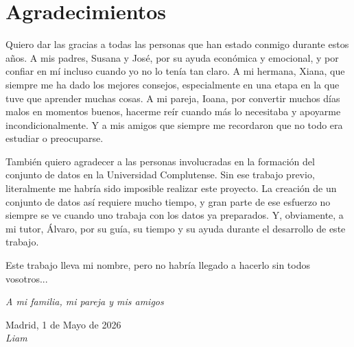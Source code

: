 \cleardoublepage

\chapter*{Agradecimientos}

{\setlength{\parskip}{0.75cm}

Quiero dar las gracias a todas las personas que han estado conmigo durante estos años. A mis padres, Susana y José, por su ayuda económica y emocional, y por confiar en mí incluso cuando yo no lo tenía tan claro. A mi hermana, Xiana, que siempre me ha dado los mejores consejos, especialmente en una etapa en la que tuve que aprender muchas cosas. A mi pareja, Ioana, por convertir muchos días malos en momentos buenos, hacerme reír cuando más lo necesitaba y apoyarme incondicionalmente. Y a mis amigos que siempre me recordaron que no todo era estudiar o preocuparse.

También quiero agradecer a las personas involucradas en la formación del conjunto de datos en la Universidad Complutense. Sin ese trabajo previo, literalmente me habría sido imposible realizar este proyecto. La creación de un conjunto de datos así requiere mucho tiempo, y gran parte de ese esfuerzo no siempre se ve cuando uno trabaja con los datos ya preparados. Y, obviamente, a mi tutor, Álvaro, por su guía, su tiempo y su ayuda durante el desarrollo de este trabajo.

Este trabajo lleva mi nombre, pero no habría llegado a hacerlo sin todos vosotros...

\par}


\begin{flushright}
		\vspace{4.0 cm}
		\emph{A mi familia, mi pareja y mis amigos}\\
		\par
		\vspace{0.5 cm}
		Madrid, 1 de Mayo de 2026\\
		\emph{Liam}
\end{flushright}

\thispagestyle{empty}
